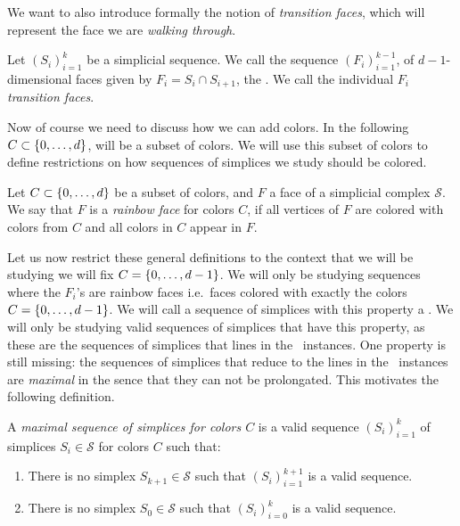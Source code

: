 We want to also introduce formally the notion of \emph{transition faces}, which will represent the face we are \emph{walking through}.

\begin{definition}
	\label{def:transition_faces}
	Let $\left(S_i\right)_{i=1}^{k}$ be a simplicial sequence. We call the sequence $\left(F_i\right)_{i=1}^{k-1}$, of $d-1$-dimensional faces given by $F_i = S_i \cap S_{i+1}$, the . We call the individual $F_i$ \emph{transition faces}.
\end{definition}

Now of course we need to discuss how we can add colors. In the following $C \subset \left\{0, \dots, d\right\}$, will be a subset of colors. We will use this subset of colors to define restrictions on how sequences of simplices we study should be colored.

\begin{definition}
	Let $C \subset \left\{0, \dots, d\right\}$ be a subset of colors, and $F$ a face of a simplicial complex $\mathcal{S}$. We say that $F$ is a \emph{rainbow face} for colors $C$, if all vertices of $F$ are colored with colors from $C$ and all colors in $C$ appear in $F$.
\end{definition}

Let us now restrict these general definitions to the context that we will be studying we will fix $C = \left\{0, \dots, d-1\right\}$.  We will only be studying sequences where the $F_i$'s are rainbow faces i.e.~faces colored with exactly the colors $C = \left\{0, \dots, d-1\right\}$. We will call a sequence of simplices with this property a . We will only be studying valid sequences of simplices that have this property, as these are the sequences of simplices that lines in the \EndOfLine\ instances. One property is still missing: the sequences of simplices that reduce to the lines in the \EndOfLine\ instances are \emph{maximal} in the sence that they can not be prolongated. This motivates the following definition.

\begin{definition}
	A \emph{maximal sequence of simplices for colors $C$} is a valid sequence $\left(S_i\right)_{i=1}^{k}$ of simplices $S_i \in \mathcal{S}$ for colors $C$ such that:
	\begin{enumerate}
		\item There is no simplex $S_{k+1} \in \mathcal{S}$ such that $\left(S_i\right)_{i=1}^{k+1}$ is a valid sequence.
		\item There is no simplex $S_{0} \in \mathcal{S}$ such that $\left(S_i\right)_{i=0}^{k}$ is a valid sequence.
	\end{enumerate}
\end{definition}

